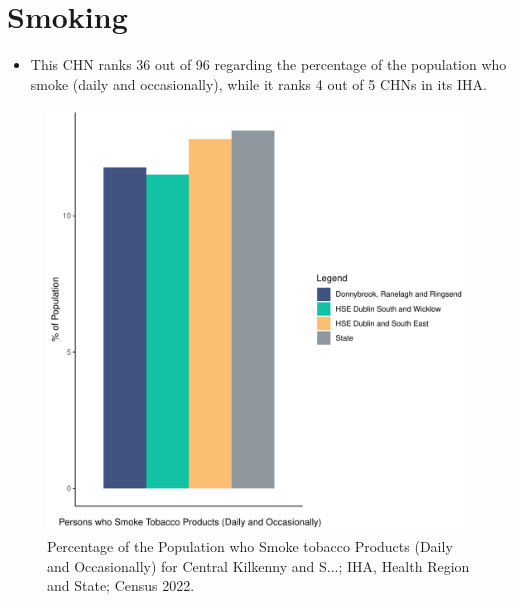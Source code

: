 \documentclass{article}
\begin{document}
\pagebreak

\section{Smoking}\label{sect:Smoking}
\begin{itemize}
\item This CHN ranks  36 out of 96 regarding the percentage of the population who smoke (daily and occasionally), while it ranks   4 out of 5 CHNs in its IHA.
\end{itemize}
\begin{figure}[H]
	\centering
	\includegraphics[width = 120mm]{../figures/SmokingED.pdf}
	\caption{Percentage of the Population who Smoke tobacco Products (Daily and Occasionally) for Central Kilkenny and S...; IHA, Health Region and State; Census 2022.}
	\label{fig:2ae19629-1a6a-13a3-e055-000000000001}
	\end{figure}
	
\end{document}
